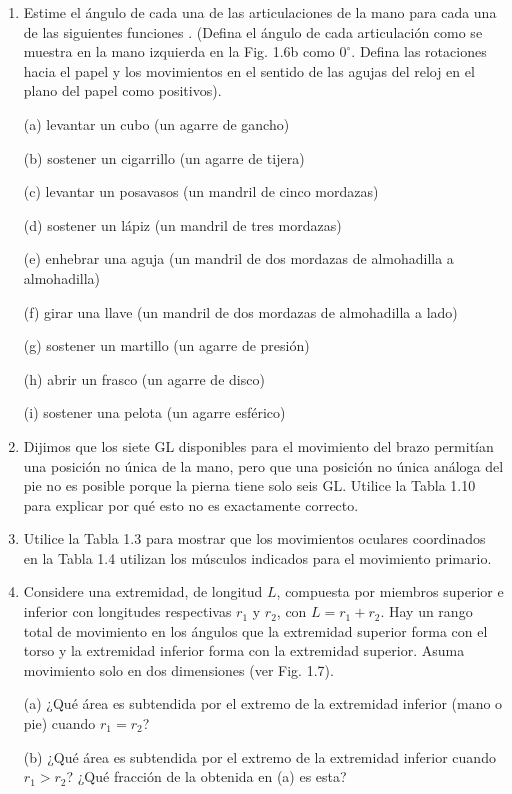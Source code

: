 \documentclass[12pt]{book}
\begin{document}
\begin{enumerate}
\item[1.20] Estime el ángulo de cada una de las articulaciones de la mano para cada una de las siguientes funciones \cite{29}. (Defina el ángulo de cada articulación como se muestra en la mano izquierda en la Fig. 1.6b como $0^\circ$. Defina las rotaciones hacia el papel y los movimientos en el sentido de las agujas del reloj en el plano del papel como positivos).
  
  (a) levantar un cubo (un agarre de gancho)
  
  (b) sostener un cigarrillo (un agarre de tijera)
  
  (c) levantar un posavasos (un mandril de cinco mordazas)
  
  (d) sostener un lápiz (un mandril de tres mordazas)
  
  (e) enhebrar una aguja (un mandril de dos mordazas de almohadilla a almohadilla)
  
  (f) girar una llave (un mandril de dos mordazas de almohadilla a lado)
  
  (g) sostener un martillo (un agarre de presión)
  
  (h) abrir un frasco (un agarre de disco)
  
  (i) sostener una pelota (un agarre esférico)

\item[1.21] Dijimos que los siete GL disponibles para el movimiento del brazo permitían una posición no única de la mano, pero que una posición no única análoga del pie no es posible porque la pierna tiene solo seis GL. Utilice la Tabla 1.10 para explicar por qué esto no es exactamente correcto.

\item[1.22] Utilice la Tabla 1.3 para mostrar que los movimientos oculares coordinados en la Tabla 1.4 utilizan los músculos indicados para el movimiento primario.

\item[1.23] Considere una extremidad, de longitud $L$, compuesta por miembros superior e inferior con longitudes respectivas $r_1$ y $r_2$, con $L = r_1 + r_2$. Hay un rango total de movimiento en los ángulos que la extremidad superior forma con el torso y la extremidad inferior forma con la extremidad superior. Asuma movimiento solo en dos dimensiones (ver Fig. 1.7).
  
  (a) ¿Qué área es subtendida por el extremo de la extremidad inferior (mano o pie) cuando $r_1 = r_2$?
  
  (b) ¿Qué área es subtendida por el extremo de la extremidad inferior cuando $r_1 > r_2$? ¿Qué fracción de la obtenida en (a) es esta?
  

\end{enumerate}
\end{document}
